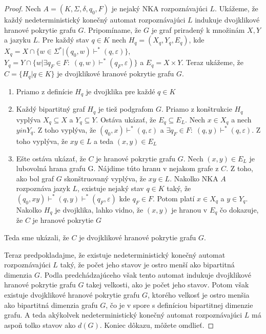 \begin{proof}
Nech $ A=(K,\Sigma,\delta,q_0,F) $ je nejaký NKA rozpoznávajúci $ L $. Ukážeme, že každý nedeterministický konečný automat rozpoznávajúci $ L $ indukuje dvojklikové hranové pokrytie grafu $ G $. Pripomíname, že $ G $ je graf priradený k množinám $ X,Y $ a jazyku $ L $. Pre každý stav $ q \in K $ nech $ H_q=(X_q,Y_q,E_q) $, kde $ X_q = X \cap \lbrace w \in \Sigma^* | (q_0,w) \vdash^* (q,\varepsilon) \rbrace $, $ Y_q = Y \cap \lbrace w | \exists q_F \in F: \; (q,w) \vdash^* (q_F,\varepsilon)  \rbrace $ a $ E_q = X \times Y $. Teraz ukážeme, že $ C = \lbrace H_q | q \in K \rbrace $ je dvojklikové hranové pokrytie grafu $ G $.

\begin{enumerate}[label=(\alph*)]
\item Priamo z definície $ H_q $ je dvojklika pre každé $ q \in K $
\item Každý bipartitný graf $ H_q $ je tiež podgrafom $ G $. Priamo z konštrukcie $ H_q $ vyplýva $ X_q \subseteq X $ a $ Y_q \subseteq Y$. Ostáva ukázať, že $ E_q \subseteq E_L $. Nech $ x \in X_q $ a nech $ y in Y_q $. Z toho vyplýva, že $ (q_0,x) \vdash^* (q,\varepsilon) $ a $ \exists q_F \in F: \; (q,y) \vdash^* (q,\varepsilon) $. Z toho vyplýva, že $ xy \in L $ a teda $ (x,y) \in E_L $
\item Ešte ostáva ukázať, že $ C $ je hranové pokrytie grafu $ G $. Nech $ (x,y) \in E_L $ je lubovolná hrana grafu G. Nájdime túto hranu v nejakom grafe z $ C $. Z toho, ako bol graf $ G $ skonštruovaný vyplýva, že $ xy \in L $. Nakolko NKA $ A $ rozpoznáva jazyk $ L $, existuje nejaký stav $ q \in K $ taký, že $ (q_0,xy) \vdash^* (q,y) \vdash^* (q_F,\varepsilon) $ kde $ q_F \in F $. Potom platí $ x \in X_q $ a $ y \in Y_q $. Nakolko $ H_q $ je dvojklika, lahko vidno, že $ (x,y) $ je hranou v $ E_q $ čo dokazuje, že $ C $ je hranové pokrytie $ G $
\end{enumerate}

Teda sme ukázali, že $ C $ je dvojklikové hranové pokrytie grafu $ G $.
\par
Teraz predpokladajme, že existuje nedeterministický konečný automat rozpoznávajúci $ L $ taký, že počet jeho stavov je ostro menší ako bipartitná dimenzia $G$. Podla predchádzajúceho však tento automat indukuje dvojklikové hranové pokrytie grafu $G$ takej velkosti, ako je počet jeho stavov. Potom však existuje dvojklikové hranové pokrytie grafu $G$, ktorého velkosť je ostro menšia ako bipartitná dimenzia grafu $G$, čo je v spore s definíciou bipartitnej dimenzie grafu. A teda akýkolvek nedeterministický konečný automat rozpoznávajúci $ L $ má aspoň tolko stavov ako $ d(G) $. Koniec dôkazu, môžete omdlieť.

\end{proof}